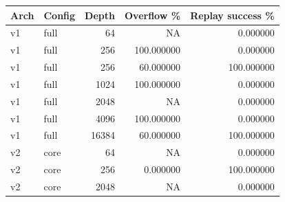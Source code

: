 \begin{tabular}{llrrr}
\toprule
Arch & Config & Depth & Overflow \% & Replay success \% \\
\midrule
v1 & full & 64 & NA & 0.000000 \\
v1 & full & 256 & 100.000000 & 0.000000 \\
v1 & full & 256 & 60.000000 & 100.000000 \\
v1 & full & 1024 & 100.000000 & 0.000000 \\
v1 & full & 2048 & NA & 0.000000 \\
v1 & full & 4096 & 100.000000 & 0.000000 \\
v1 & full & 16384 & 60.000000 & 100.000000 \\
v2 & core & 64 & NA & 0.000000 \\
v2 & core & 256 & 0.000000 & 100.000000 \\
v2 & core & 2048 & NA & 0.000000 \\
\bottomrule
\end{tabular}
